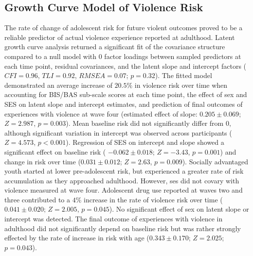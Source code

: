 \documentclass[utf8]{article}
\begin{document}
\subsection{Growth Curve Model of Violence Risk} The rate of change of adolescent risk for future violent outcomes proved to be a reliable predictor of actual violence experience reported at adulthood. Latent growth curve analysis returned a significant fit of the covariance structure compared to a null model with 0 factor loadings between sampled predictors at each time point, residual covariances, and the latent slope and intercept factors ($CFI = 0.96$, $TLI = 0.92$, $RMSEA = 0.07$; $p = 0.32$). The fitted model demonstrated an average increase of $20.5\%$ in violence risk over time when accounting for BIS/BAS sub-scale scores at each time point, the effect of sex and SES on latent slope and intercept estimates, and prediction of final outcomes of experiences with violence at wave four (estimated effect of slope: $0.205\pm0.069$; $Z=2.987$, $p=0.003$). Mean baseline risk did not significantly differ from $0$, although significant variation in intercept was observed across participants ($Z=4.573$, $p<0.001$). Regression of SES on intercept and slope showed a significant effect on baseline risk ( $-0.062\pm0.018$; $Z=-3.43$, $p=0.001$) and change in risk over time ($0.031\pm0.012$; $Z=2.63$, $p=0.009$). Socially advantaged youth started at lower pre-adolescent risk, but experienced a greater rate of risk accumulation as they approached adulthood. However, ses did not covary with violence measured at wave four. Adolescent drug use reported at waves two and three contributed to a $4\%$ increase in the rate of violence risk over time ($0.041\pm0.020$; $Z=2.005$, $p=0.045$). No significant effect of sex on latent slope or intercept was detected. The final outcome of experiences with violence in adulthood did not significantly depend on baseline risk but was rather strongly effected by the rate of increase in risk with age ($0.343\pm0.170$; $Z=2.025$; $p=0.043$). 
\end{document}
